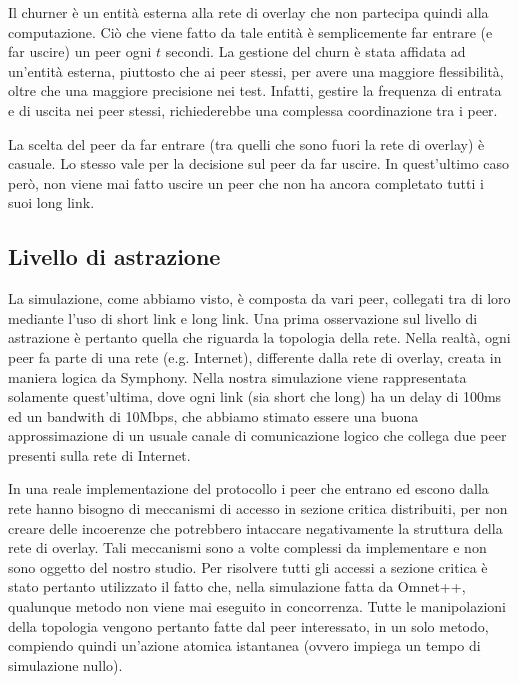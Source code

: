 \documentclass[prodmode,acmtap]{acmlarge}
\begin{document}
Il churner è un entità esterna alla rete di overlay che non partecipa quindi alla computazione. Ciò che viene fatto da tale entità è semplicemente far entrare (e far uscire) un peer ogni $t$ secondi. La gestione del churn è stata affidata ad un'entità esterna, piuttosto che ai peer stessi, per avere una maggiore flessibilità, oltre che una maggiore precisione nei test. Infatti, gestire la frequenza di entrata e di uscita nei peer stessi, richiederebbe una complessa coordinazione tra i peer. 

La scelta del peer da far entrare (tra quelli che sono fuori la rete di overlay) è casuale. Lo stesso vale per la decisione sul peer da far uscire. In quest'ultimo caso però, non viene mai fatto uscire un peer che non ha ancora completato tutti i suoi long link.


\subsection{Livello di astrazione}

La simulazione, come abbiamo visto, è composta da vari peer, collegati tra di loro mediante l'uso di short link e long link. Una prima osservazione sul livello di astrazione è pertanto quella che riguarda la topologia della rete. Nella realtà, ogni peer fa parte di una rete (e.g. Internet), differente dalla rete di overlay, creata in maniera logica da Symphony. Nella nostra simulazione viene rappresentata solamente quest'ultima, dove ogni link (sia short che long) ha un delay di 100ms ed un bandwith di 10Mbps, che abbiamo stimato essere una buona approssimazione di un usuale canale di comunicazione logico che collega due peer presenti sulla rete di Internet.

In una reale implementazione del protocollo i peer che entrano ed escono dalla rete hanno bisogno di meccanismi di accesso in sezione critica distribuiti, per non creare delle incoerenze che potrebbero intaccare negativamente la struttura della rete di overlay. Tali meccanismi sono a volte complessi da implementare e non sono oggetto del nostro studio. Per risolvere tutti gli accessi a sezione critica è stato pertanto utilizzato il fatto che, nella simulazione fatta da Omnet++, qualunque metodo non viene mai eseguito in concorrenza. Tutte le manipolazioni della topologia vengono pertanto fatte dal peer interessato, in un solo metodo, compiendo quindi un'azione atomica istantanea (ovvero impiega un tempo di simulazione nullo). 
\end{document}
